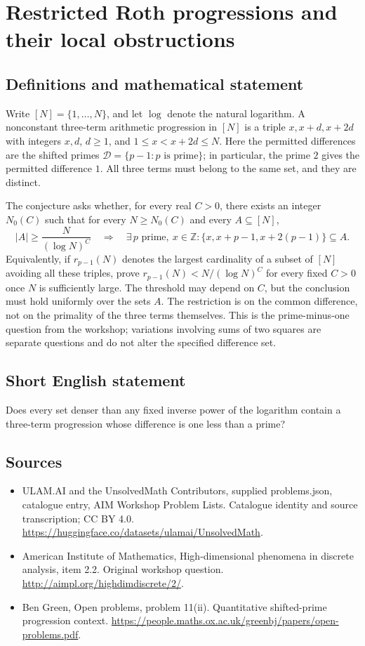 \documentclass[11pt,a4paper]{article}
\begin{document}
\section*{Restricted Roth progressions and their local obstructions}\label{statement}

\subsection{Definitions and mathematical statement}
Write $[N]=\{1,\ldots,N\}$, and let $\log$ denote the natural logarithm.
A nonconstant three-term arithmetic progression in $[N]$ is a triple
$x,x+d,x+2d$ with integers $x,d$, $d\geq1$, and $1\leq x<x+2d\leq N$.
Here the permitted differences are the shifted primes
$\mathcal D=\{p-1:p\text{ is prime}\}$; in particular, the prime $2$ gives the permitted difference $1$.
All three terms must belong to the same set, and they are distinct.

The conjecture asks whether, for every real $C>0$, there exists an integer $N_0(C)$ such that for every $N\geq N_0(C)$ and every $A\subseteq[N]$,
\[
 |A|\geq\frac{N}{(\log N)^C}
 \quad\Longrightarrow\quad
 \exists\,p\text{ prime},\ x\in\mathbb Z:
 \{x,x+p-1,x+2(p-1)\}\subseteq A.
\]
Equivalently, if $r_{p-1}(N)$ denotes the largest cardinality of a subset of $[N]$ avoiding all these triples, prove
$r_{p-1}(N)<N/(\log N)^C$ for every fixed $C>0$ once $N$ is sufficiently large.
The threshold may depend on $C$, but the conclusion must hold uniformly over the sets $A$.
The restriction is on the common difference, not on the primality of the three terms themselves.
This is the prime-minus-one question from the workshop; variations involving sums of two squares are separate questions and do not alter the specified difference set.
\subsection{Short English statement}
Does every set denser than any fixed inverse power of the logarithm contain a three-term progression whose difference is one less than a prime?
\subsection{Sources}
\begin{itemize}
\item[S1] ULAM.AI and the UnsolvedMath Contributors, supplied problems.json, catalogue entry, AIM Workshop Problem Lists. Catalogue identity and source transcription; CC BY 4.0.
\url{https://huggingface.co/datasets/ulamai/UnsolvedMath}.
\item[S2] American Institute of Mathematics, High-dimensional phenomena in discrete analysis, item 2.2. Original workshop question.
\url{http://aimpl.org/highdimdiscrete/2/}.
\item[S3] Ben Green, Open problems, problem 11(ii). Quantitative shifted-prime progression context.
\url{https://people.maths.ox.ac.uk/greenbj/papers/open-problems.pdf}.
\end{itemize}
\end{document}
